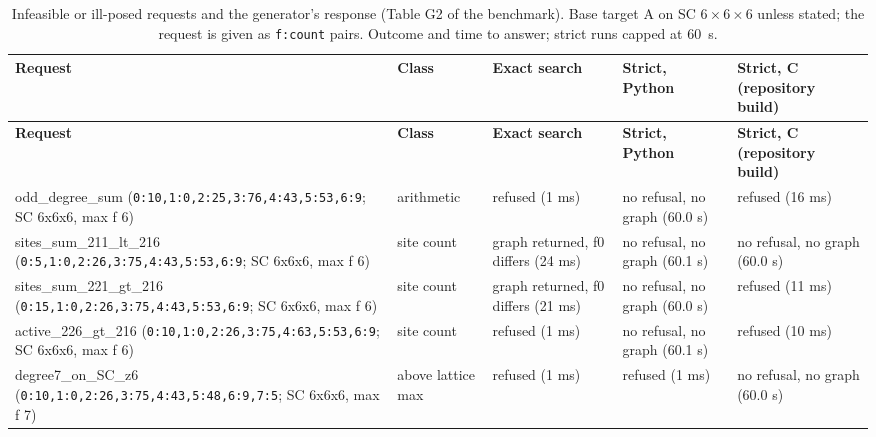 \begingroup\scriptsize\setlength{\tabcolsep}{3pt}\renewcommand{\arraystretch}{1.15}
\begin{longtable}{>{\raggedright\arraybackslash}p{4.6cm}>{\raggedright\arraybackslash}p{2.4cm}>{\raggedright\arraybackslash}p{2.7cm}>{\raggedright\arraybackslash}p{2.3cm}>{\raggedright\arraybackslash}p{2.3cm}}
\caption{Infeasible or ill-posed requests and the generator's response (Table G2 of the benchmark). Base target A on SC $6\times6\times6$ unless stated; the request is given as \texttt{f:count} pairs. Outcome and time to answer; strict runs capped at 60~s.}\label{tab:infeasible}\\
\toprule
\textbf{Request} & \textbf{Class} & \textbf{Exact search} & \textbf{Strict, Python} & \textbf{Strict, C (repository build)} \\
\midrule
\endfirsthead
\toprule
\textbf{Request} & \textbf{Class} & \textbf{Exact search} & \textbf{Strict, Python} & \textbf{Strict, C (repository build)} \\
\midrule
\endhead
\bottomrule
\endfoot
odd\_\allowbreak{}degree\_\allowbreak{}sum (\texttt{0:10,\allowbreak{}1:0,\allowbreak{}2:25,\allowbreak{}3:76,\allowbreak{}4:43,\allowbreak{}5:53,\allowbreak{}6:9}; SC 6x6x6, max f 6) & arithmetic & refused (1 ms) & no refusal, no graph (60.0 s) & refused (16 ms) \\
sites\_\allowbreak{}sum\_\allowbreak{}211\_\allowbreak{}lt\_\allowbreak{}216 (\texttt{0:5,\allowbreak{}1:0,\allowbreak{}2:26,\allowbreak{}3:75,\allowbreak{}4:43,\allowbreak{}5:53,\allowbreak{}6:9}; SC 6x6x6, max f 6) & site count & graph returned, f0 differs (24 ms) & no refusal, no graph (60.1 s) & no refusal, no graph (60.0 s) \\
sites\_\allowbreak{}sum\_\allowbreak{}221\_\allowbreak{}gt\_\allowbreak{}216 (\texttt{0:15,\allowbreak{}1:0,\allowbreak{}2:26,\allowbreak{}3:75,\allowbreak{}4:43,\allowbreak{}5:53,\allowbreak{}6:9}; SC 6x6x6, max f 6) & site count & graph returned, f0 differs (21 ms) & no refusal, no graph (60.0 s) & refused (11 ms) \\
active\_\allowbreak{}226\_\allowbreak{}gt\_\allowbreak{}216 (\texttt{0:10,\allowbreak{}1:0,\allowbreak{}2:26,\allowbreak{}3:75,\allowbreak{}4:63,\allowbreak{}5:53,\allowbreak{}6:9}; SC 6x6x6, max f 6) & site count & refused (1 ms) & no refusal, no graph (60.1 s) & refused (10 ms) \\
degree7\_\allowbreak{}on\_\allowbreak{}SC\_\allowbreak{}z6 (\texttt{0:10,\allowbreak{}1:0,\allowbreak{}2:26,\allowbreak{}3:75,\allowbreak{}4:43,\allowbreak{}5:48,\allowbreak{}6:9,\allowbreak{}7:5}; SC 6x6x6, max f 7) & above lattice max & refused (1 ms) & refused (1 ms) & no refusal, no graph (60.0 s) \\

\end{longtable}
